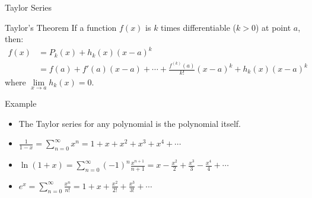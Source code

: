 \documentclass{beamer}
\begin{document}
\begin{frame}{Taylor Series}

    \begin{block}{Taylor's Theorem}
        If a function $f(x)$ is $k$ times differentiable ($k>0$) at point $a$, then:
        \begin{align*}
             f(x) &= P_k(x)+h_k(x)(x-a)^k  \\
             &=f(a) + f'(a)(x-a) +  \cdots + \frac{f^{(k)}(a)}{k!}(x-a)^k + h_k(x)(x-a)^k
        \end{align*}
        \pause where $\lim\limits_{x\to a}h_k(x)=0$.
    \end{block}
    \pause
\begin{exampleblock}{Example}
\begin{itemize}
    \item The Taylor series for any polynomial is the polynomial itself.
    \item     $\frac{1}{1-x}= \sum_{n=0}^\infty x^n =
      1+x+x^2+x^3+x^4+\cdots $
\item $\ln(1+x)=\sum_{n=0}^\infty(-1)^n\frac{x^{n+1}}{n+1}=x -
      \frac{x^2}{2} + \frac{x^3}{3} -\frac{x^4}{4}+ \cdots$
    \item $e^x = \sum_{n=0}^{\infty} \frac{x^n}{n!} = 1 + x + \frac{x^2}{2!} + \frac{x^3}{3!} + \cdots
$
\end{itemize} 
    \end{exampleblock}
    
\end{frame}
\end{document}

